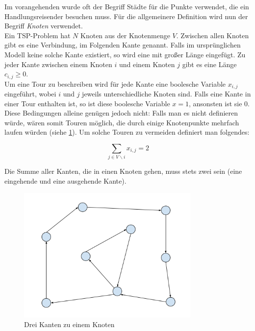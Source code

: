\documentclass[a4paper, 11pt]{article}
\begin{document}
Im vorangehenden wurde oft der Begriff Städte für die Punkte verwendet, die
ein Handlungsreisender besuchen muss. Für die allgemeinere Definition wird
nun der Begriff \textit{Knoten} verwendet. \\

Ein TSP-Problem hat $N$ Knoten aus der Knotenmenge $V$. Zwischen allen Knoten
gibt es eine Verbindung, im Folgenden Kante genannt. Falls im ursprünglichen
Modell keine solche Kante existiert, so wird eine mit großer Länge eingefügt.
Zu jeder Kante zwischen einem Knoten $i$ und einem Knoten $j$ gibt es eine
Länge $c_{i,j} \geq 0$. \\

Um eine Tour zu beschreiben wird für jede Kante eine boolesche Variable $x_{i,j}$
eingeführt, wobei $i$ und $j$ jeweils unterschiedliche Knoten sind. Falls eine
Kante in einer Tour enthalten ist, so ist diese boolesche Variable $x = 1$,
ansonsten ist sie $0$. \\

Diese Bedingungen alleine genügen jedoch nicht: Falls man es nicht definieren
würde, wären somit Touren möglich, die durch einige Knotenpunkte mehrfach laufen
würden (siehe \ref{fig:multiple_connections_per_node}). Um solche Touren zu
vermeiden definiert man folgendes:

$$\sum_{j \in V \backslash i}x_{i,j} = 2$$

Die Summe aller Kanten, die in einen Knoten gehen, muss stets zwei sein (eine
eingehende und eine ausgehende Kante). \\

\begin{figure}[p]
    \centering
    \includegraphics[width=0.8\textwidth]{invalid_tour.png}
    \caption{Drei Kanten zu einem Knoten}
    \label{fig:multiple_connections_per_node}
\end{figure}
\end{document}
